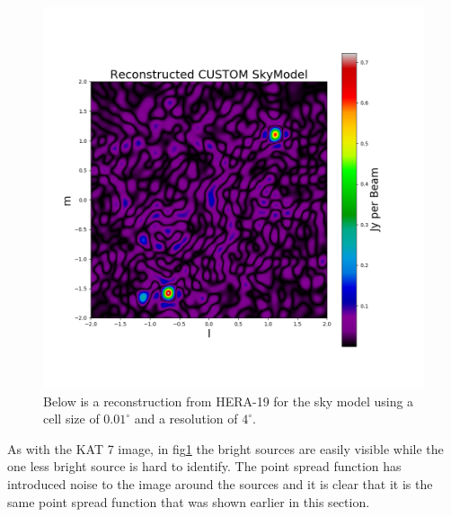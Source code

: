 \begin{figure}[H]
    \centering
    \includegraphics[scale=0.4]{images/RECON_HERA_19_4_POINT.png}
    \caption{Below is a reconstruction from HERA-19 for the sky model using a cell size of $0.01^\circ$ and a resolution of $4^\circ$.}
    \label{fig:hera-19_recon}
\end{figure}

As with the KAT 7 image, in fig\ref{fig:hera-19_recon} the bright sources are easily visible while the one less bright source is hard to identify. The point spread function has introduced noise to the image around the sources and it is clear that it is the same point spread function that was shown earlier in this section.

